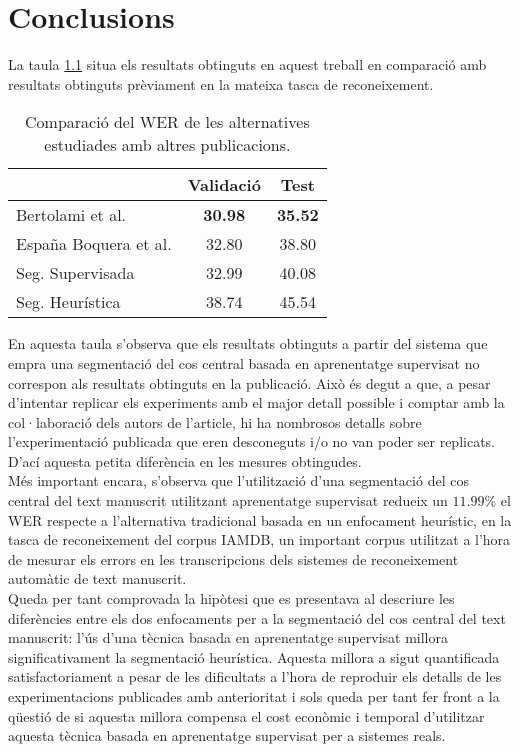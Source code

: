 \chapter{Conclusions}
\label{cap:con}

La taula \ref{tab:summary} situa els resultats obtinguts en aquest treball en comparació amb resultats obtinguts prèviament en la mateixa tasca de reconeixement.\\

\begin{table}
\begin{center}
\begin{tabular}{|l|c|c|}
\hline
& Validació & Test \\\hline\hline
Bertolami et al. \cite{bertolami2008hidden} & \textbf{30.98} & \textbf{35.52} \\\hline
España Boquera et al. \cite{espana2011improving} & 32.80 & 38.80  \\\hline
Seg. Supervisada & 32.99 & 40.08 \\\hline
Seg. Heurística & 38.74 & 45.54 \\\hline
\end{tabular}
\caption{Comparació del WER de les alternatives estudiades amb altres publicacions.}\label{tab:summary}
\end{center}
\end{table}

En aquesta taula s'observa que els resultats obtinguts a partir del sistema que empra una segmentació del cos central basada en aprenentatge supervisat no correspon als resultats obtinguts en la publicació. Això és degut a que, a pesar d'intentar replicar els experiments amb el major detall possible i comptar amb la col·laboració dels autors de l'article, hi ha nombrosos detalls sobre l'experimentació publicada que eren desconeguts i/o no van poder ser replicats. D'ací aquesta petita diferència en les mesures obtingudes.\\

Més important encara, s'observa que l'utilització d'una segmentació del cos central del text manuscrit utilitzant aprenentatge supervisat redueix un $11.99\%$ el WER respecte a l'alternativa tradicional basada en un enfocament heurístic, en la tasca de reconeixement del corpus IAMDB, un important corpus utilitzat a l'hora de mesurar els errors en les transcripcions dels sistemes de reconeixement automàtic de text manuscrit.\\

Queda per tant comprovada la hipòtesi que es presentava al descriure les diferències entre els dos enfocaments per a la segmentació del cos central del text manuscrit: l'ús d'una tècnica basada en aprenentatge supervisat millora significativament la segmentació heurística. Aquesta millora a sigut quantificada satisfactoriament a pesar de les dificultats a l'hora de reproduir els detalls de les experimentacions publicades amb anterioritat i sols queda per tant fer front a la qüestió de si aquesta millora compensa el cost econòmic i temporal d'utilitzar aquesta tècnica basada en aprenentatge supervisat per a sistemes reals.